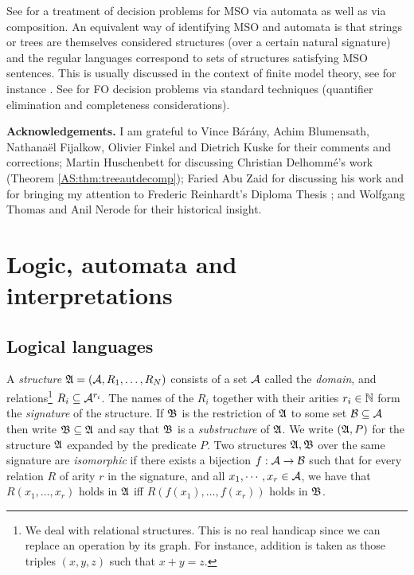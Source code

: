 See  \cite{Gure85} for a treatment of decision problems  for MSO via automata as well as via composition. An equivalent way of identifying MSO and automata is that strings or trees are themselves considered structures (over a certain natural signature) and the regular languages correspond to sets of structures satisfying MSO sentences. This is usually discussed in the context of finite model theory, see for instance \cite{EbFl95}. See \cite{Rabi77} for FO decision problems via standard techniques  (quantifier elimination and completeness considerations). %



{\bf Acknowledgements.} I am grateful to Vince B{\'a}r{\'a}ny, Achim Blumensath, Nathana\"el Fijalkow, Olivier Finkel and Dietrich Kuske for their comments and corrections; Martin Huschenbett for discussing Christian Delhomm{\'e}'s work \cite{Delh04} (Theorem \ref{AS:thm:treeautdecomp}); Faried Abu Zaid for discussing his work and for bringing my attention to Frederic Reinhardt's Diploma Thesis \cite{Reinhardt13}; and Wolfgang Thomas and Anil Nerode for their historical insight.

\section{Logic, automata and interpretations} \label{AS:sec:back}


 
\subsection{Logical languages} \label{AS:subsec:logic}

A \emph{structure}  $\mathfrak{A} = ({\mathcal A}, R_1, \dots, R_N)$ consists of a set ${\mathcal A}$ called the {\em domain}, and relations\footnote{We deal with relational structures. This is no real handicap since we can replace an operation by its graph. For instance, addition is taken as those triples $(x,y,z)$ such that $x+y = z$.} $R_i \subseteq {\mathcal A}^{r_i}$. The names of the $R_i$ together with their arities $r_i \in \mathbb{N}$ form the \emph{signature} of the structure. If $\mathfrak{B}$ is the restriction of $\mathfrak{A}$ to some set ${\mathcal B} \subseteq {\mathcal A}$ then write $\mathfrak{B} \subseteq \mathfrak{A}$ and say that $\mathfrak{B}$ is a \emph{substructure} of $\mathfrak{A}$. We write $(\mathfrak{A},P)$ for the structure $\mathfrak{A}$ expanded by the predicate $P$. Two structures $\mathfrak{A},\mathfrak{B}$ over the same signature are \emph{isomorphic} if there exists a bijection $f:{\mathcal A} \to {\mathcal B}$ such that for every relation $R$ of arity $r$ in the signature, and all $x_1, \cdots, x_r \in {\mathcal A}$, we have that 
$R(x_1, \dots, x_r)$ holds in $\mathfrak{A}$ iff $R(f(x_1), \dots, f(x_r))$ holds in $\mathfrak{B}$.

